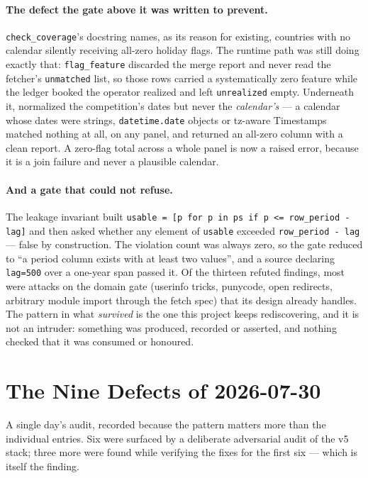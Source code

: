 \documentclass[11pt,a4paper]{article}
\begin{document}
\paragraph{The defect the gate above it was written to prevent.} \texttt{check\_coverage}'s
docstring names, as its reason for existing, countries with no calendar silently receiving
all-zero holiday flags. The runtime path was still doing exactly that: \texttt{flag\_feature}
discarded the merge report and never read the fetcher's \texttt{unmatched} list, so those rows
carried a systematically zero feature while the ledger booked the operator realized and left
\texttt{unrealized} empty. Underneath it,  normalized the
competition's dates but never the \emph{calendar's} --- a calendar whose dates were strings,
\texttt{datetime.date} objects or tz-aware Timestamps matched nothing at all, on any panel,
and returned an all-zero column with a clean report. A zero-flag total across a whole panel is
now a raised error, because it is a join failure and never a plausible calendar.

\paragraph{And a gate that could not refuse.} The leakage invariant built
\texttt{usable = [p for p in ps if p <= row\_period - lag]} and then asked whether any element
of \texttt{usable} exceeded \texttt{row\_period - lag} --- false by construction. The violation
count was always zero, so the gate reduced to ``a period column exists with at least two
values'', and a source declaring \texttt{lag=500} over a one-year span passed it. Of the
thirteen refuted findings, most were attacks on the domain gate (userinfo tricks, punycode,
open redirects, arbitrary module import through the fetch spec) that its design already
handles. The pattern in what \emph{survived} is the one this project keeps rediscovering, and
it is not an intruder: something was produced, recorded or asserted, and nothing checked that
it was consumed or honoured.

\section{The Nine Defects of 2026-07-30}

A single day's audit, recorded because the pattern matters more than the individual entries.
Six were surfaced by a deliberate adversarial audit of the v5 stack; three more were found
while verifying the fixes for the first six --- which is itself the finding.
\end{document}
